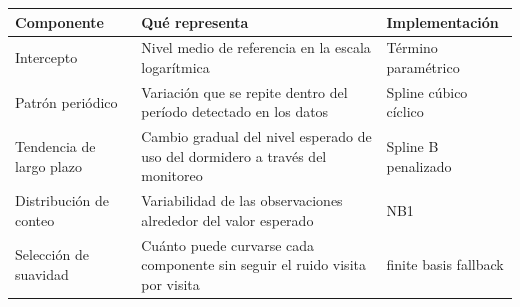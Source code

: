 \begin{tabular}{lll}
\toprule
Componente & Qué representa & Implementación \\
\midrule
Intercepto & Nivel medio de referencia en la escala logarítmica & Término paramétrico \\
Patrón periódico & Variación que se repite dentro del período detectado en los datos & Spline cúbico cíclico \\
Tendencia de largo plazo & Cambio gradual del nivel esperado de uso del dormidero a través del monitoreo & Spline B penalizado \\
Distribución de conteo & Variabilidad de las observaciones alrededor del valor esperado & NB1 \\
Selección de suavidad & Cuánto puede curvarse cada componente sin seguir el ruido visita por visita & finite basis fallback \\
\bottomrule
\end{tabular}

